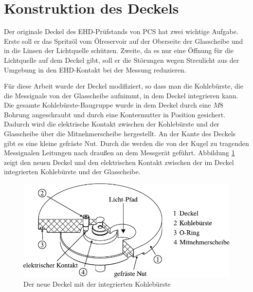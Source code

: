 \section{Konstruktion des Deckels}
\label{sec:konstruktion_des_deckels}

Der originale Deckel des EHD-Prüfstands von PCS hat zwei wichtige Aufgabe.
Erste soll er das Spritzöl vom Ölreservoir auf der Oberseite der Glasscheibe und in die Linsen der Lichtquelle schützen.
Zweite, da es nur eine Öffnung für die Lichtquelle auf dem Deckel gibt, soll er die Störungen wegen Streulicht aus der Umgebung in den EHD-Kontakt bei der Messung reduzieren.

Für diese Arbeit wurde der Deckel modifiziert, so dass man die Kohlebürste, die die Messignale von der Glasscheibe aufnimmt, in dem Deckel integrieren kann.
Die gesamte Kohlebürste-Baugruppe wurde in dem Deckel durch eine $M8$ Bohrung angeschraubt und durch eine Kontermutter in Position gesichert.
Dadurch wird die elektrische Kontakt zwischen der Kohlebürste und der Glasscheibe über die Mitnehmerscheibe hergestellt.
An der Kante des Deckels gibt es eine kleine gefräste Nut.
Durch die werden die von der Kugel zu tragenden Messignalen Leitungen nach draußen an dem Messgerät geführt.
Abbildung \ref{fig:deckel_mit_kohlebuersten} zeigt den neuen Deckel und den elektrischen Kontakt zwischen der im Deckel integrierten Kohlebürste und der Glasscheibe.
\begin{figure}[htb]
    \centering
    \includegraphics[]{./images/deckel_und_scheibe.pdf}
    \caption{Der neue Deckel mit der integrierten Kohlebürste}
    \label{fig:deckel_mit_kohlebuersten}
\end{figure}
%
